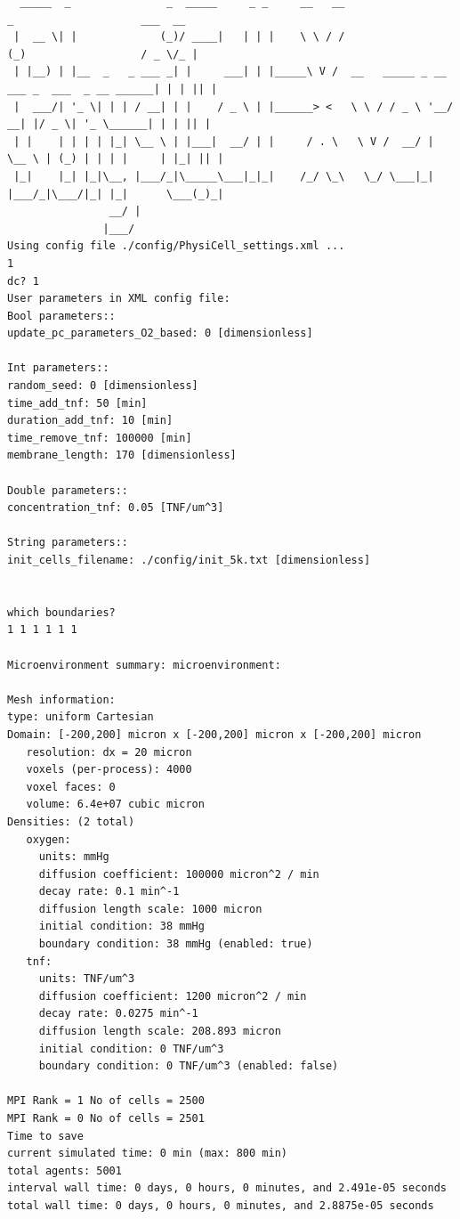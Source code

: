 \documentclass[12pt]{article}
\begin{document}
\begin{scriptsize}
\begin{verbatim}
  _____  _               _  _____     _ _     __   __                     _                    ___  __	
 |  __ \| |             (_)/ ____|   | | |    \ \ / /                    (_)                  / _ \/_ |
 | |__) | |__  _   _ ___ _| |     ___| | |_____\ V /  __   _____ _ __ ___ _  ___  _ __ ______| | | || |
 |  ___/| '_ \| | | / __| | |    / _ \ | |______> <   \ \ / / _ \ '__/ __| |/ _ \| '_ \______| | | || |
 | |    | | | | |_| \__ \ | |___|  __/ | |     / . \   \ V /  __/ |  \__ \ | (_) | | | |     | |_| || |
 |_|    |_| |_|\__, |___/_|\_____\___|_|_|    /_/ \_\   \_/ \___|_|  |___/_|\___/|_| |_|      \___(_)_|
                __/ |                                                                                  
               |___/                                                                                   
Using config file ./config/PhysiCell_settings.xml ... 
1
dc? 1
User parameters in XML config file: 
Bool parameters:: 
update_pc_parameters_O2_based: 0 [dimensionless]

Int parameters:: 
random_seed: 0 [dimensionless]
time_add_tnf: 50 [min]
duration_add_tnf: 10 [min]
time_remove_tnf: 100000 [min]
membrane_length: 170 [dimensionless]

Double parameters:: 
concentration_tnf: 0.05 [TNF/um^3]

String parameters:: 
init_cells_filename: ./config/init_5k.txt [dimensionless]


which boundaries?
1 1 1 1 1 1

Microenvironment summary: microenvironment: 

Mesh information: 
type: uniform Cartesian
Domain: [-200,200] micron x [-200,200] micron x [-200,200] micron
   resolution: dx = 20 micron
   voxels (per-process): 4000
   voxel faces: 0
   volume: 6.4e+07 cubic micron
Densities: (2 total)
   oxygen:
     units: mmHg
     diffusion coefficient: 100000 micron^2 / min
     decay rate: 0.1 min^-1
     diffusion length scale: 1000 micron
     initial condition: 38 mmHg
     boundary condition: 38 mmHg (enabled: true)
   tnf:
     units: TNF/um^3
     diffusion coefficient: 1200 micron^2 / min
     decay rate: 0.0275 min^-1
     diffusion length scale: 208.893 micron
     initial condition: 0 TNF/um^3
     boundary condition: 0 TNF/um^3 (enabled: false)

MPI Rank = 1 No of cells = 2500
MPI Rank = 0 No of cells = 2501
Time to save
current simulated time: 0 min (max: 800 min)
total agents: 5001
interval wall time: 0 days, 0 hours, 0 minutes, and 2.491e-05 seconds 
total wall time: 0 days, 0 hours, 0 minutes, and 2.8875e-05 seconds 



\end{verbatim}
\end{scriptsize}
\end{document}
